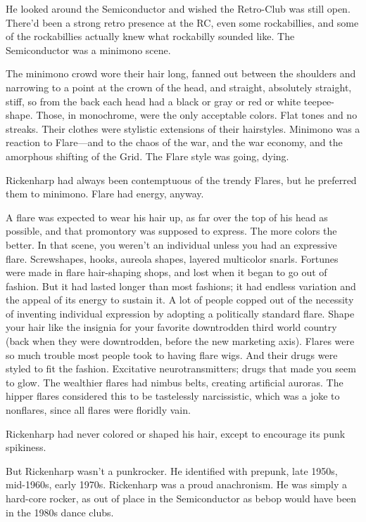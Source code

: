 He looked around the Semiconductor and wished the Retro-Club was still open. There'd been a strong retro presence at the RC, even some rockabillies, and some of the rockabillies actually knew what rockabilly sounded like. The Semiconductor was a minimono scene.

The minimono crowd wore their hair long, fanned out between the shoulders and narrowing to a point at the crown of the head, and straight, absolutely straight, stiff, so from the back each head had a black or gray or red or white teepee-shape. Those, in monochrome, were the only acceptable colors. Flat tones and no streaks. Their clothes were stylistic extensions of their hairstyles. Minimono was a reaction to Flare—and to the chaos of the war, and the war economy, and the amorphous shifting of the Grid. The Flare style was going, dying.

Rickenharp had always been contemptuous of the trendy Flares, but he preferred them to minimono. Flare had energy, anyway.

A flare was expected to wear his hair up, as far over the top of his head as possible, and that promontory was supposed to express. The more colors the better. In that scene, you weren't an individual unless you had an expressive flare. Screwshapes, hooks, aureola shapes, layered multicolor snarls. Fortunes were made in flare hair-shaping shops, and lost when it began to go out of fashion. But it had lasted longer than most fashions; it had endless variation and the appeal of its energy to sustain it. A lot of people copped out of the necessity of inventing individual expression by adopting a politically standard flare. Shape your hair like the insignia for your favorite downtrodden third world country (back when they were downtrodden, before the new marketing axis). Flares were so much trouble most people took to having flare wigs. And their drugs were styled to fit the fashion. Excitative neurotransmitters; drugs that made you seem to glow. The wealthier flares had nimbus belts, creating artificial auroras. The hipper flares considered this to be tastelessly narcissistic, which was a joke to nonflares, since all flares were floridly vain.

Rickenharp had never colored or shaped his hair, except to encourage its punk spikiness.

But Rickenharp wasn't a punkrocker. He identified with prepunk, late 1950s, mid-1960s, early 1970s. Rickenharp was a proud anachronism. He was simply a hard-core rocker, as out of place in the Semiconductor as bebop would have been in the 1980s dance clubs.

